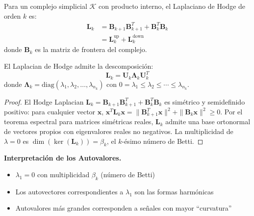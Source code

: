 \begin{definition}\label{def:hodge_laplacian_discreto}
Para un complejo simplicial $\mathcal{K}$ con producto interno, el Laplaciano de Hodge de orden $k$ es:
\begin{align}
    \mathbf{L}_k &= \mathbf{B}_{k+1} \mathbf{B}_{k+1}^T + \mathbf{B}_k^T \mathbf{B}_k \\
    &= \mathbf{L}_k^{\text{up}} + \mathbf{L}_k^{\text{down}}
\end{align}
donde $\mathbf{B}_k$ es la matriz de frontera del complejo.
\end{definition}

\begin{theorem}\label{thm:descomposicion_hodge_laplacian}
El Laplacian de Hodge admite la descomposición:
\begin{equation}
    \mathbf{L}_k = \mathbf{U}_k \boldsymbol{\Lambda}_k \mathbf{U}_k^T
\end{equation}
donde $\boldsymbol{\Lambda}_k = \text{diag}(\lambda_1, \lambda_2, \ldots, \lambda_{n_k})$ con $0 = \lambda_1 \leq \lambda_2 \leq \cdots \leq \lambda_{n_k}$.
\end{theorem}

\begin{proof}
El Hodge Laplacian $\mathbf{L}_k = \mathbf{B}_{k+1}\mathbf{B}_{k+1}^T + \mathbf{B}_k^T\mathbf{B}_k$ es simétrico y semidefinido positivo: para cualquier vector $\mathbf{x}$, $\mathbf{x}^T \mathbf{L}_k \mathbf{x} = \|\mathbf{B}_{k+1}^T \mathbf{x}\|^2 + \|\mathbf{B}_k \mathbf{x}\|^2 \geq 0$. Por el teorema espectral para matrices simétricas reales, $\mathbf{L}_k$ admite una base ortonormal de vectores propios con eigenvalores reales no negativos. La multiplicidad de $\lambda = 0$ es $\dim(\ker(\mathbf{L}_k)) = \beta_k$, el $k$-ésimo número de Betti.
\end{proof}

\textbf{Interpretación de los Autovalores.}\label{rem:interpretacion_autovalores_hodge}
\begin{itemize}
    \item $\lambda_1 = 0$ con multiplicidad $\beta_k$ (número de Betti)
    \item Los autovectores correspondientes a $\lambda_1$ son las formas harmónicas
    \item Autovalores más grandes corresponden a señales con mayor ``curvatura''
\end{itemize}

